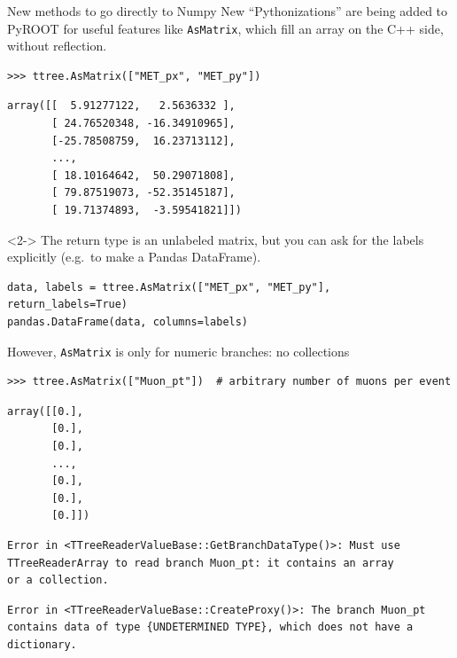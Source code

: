 \documentclass[aspectratio=169]{beamer}
\begin{document}
\begin{frame}[fragile]{New methods to go directly to Numpy}
\large
\vspace{0.5 cm}
New ``Pythonizations'' are being added to PyROOT for useful features like {\tt AsMatrix}, which fill an array on the C++ side, without reflection.

\small
\begin{verbatim}
>>> ttree.AsMatrix(["MET_px", "MET_py"])
\end{verbatim}
\color{darkblue}\vspace{-0.5\baselineskip}\begin{verbatim}
array([[  5.91277122,   2.5636332 ],
       [ 24.76520348, -16.34910965],
       [-25.78508759,  16.23713112],
       ...,
       [ 18.10164642,  50.29071808],
       [ 79.87519073, -52.35145187],
       [ 19.71374893,  -3.59541821]])
\end{verbatim}
\color{black}
\large

\vspace{0.25 cm}
\begin{uncoverenv}<2->
The return type is an unlabeled matrix, but you can ask for the labels explicitly (e.g.\ to make a Pandas DataFrame).

\small
\begin{verbatim}
data, labels = ttree.AsMatrix(["MET_px", "MET_py"], return_labels=True)
pandas.DataFrame(data, columns=labels)
\end{verbatim}
\end{uncoverenv}
\end{frame}

\begin{frame}[fragile]{However, {\tt AsMatrix} is only for numeric branches: no collections}
\vspace{0.5 cm}

\small
\begin{verbatim}
>>> ttree.AsMatrix(["Muon_pt"])  # arbitrary number of muons per event
\end{verbatim}
\color{darkblue}\vspace{-0.5\baselineskip}\begin{verbatim}
array([[0.],
       [0.],
       [0.],
       ...,
       [0.],
       [0.],
       [0.]])
\end{verbatim}

\vspace{-0.2 cm}
\color{gray}
\begin{verbatim}
Error in <TTreeReaderValueBase::GetBranchDataType()>: Must use
TTreeReaderArray to read branch Muon_pt: it contains an array
or a collection.
\end{verbatim}
\begin{verbatim}
Error in <TTreeReaderValueBase::CreateProxy()>: The branch Muon_pt
contains data of type {UNDETERMINED TYPE}, which does not have a
dictionary.
\end{verbatim}
\end{frame}
\end{document}
